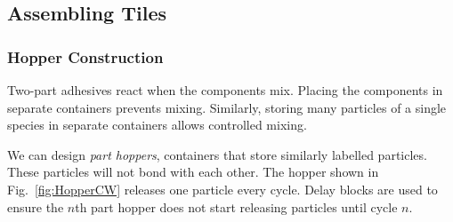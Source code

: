   
\subsection{Assembling Tiles}


\subsubsection{Hopper Construction}\label{subsec:HopperConstruction}
Two-part adhesives react when the components mix.  Placing the components in separate containers prevents mixing.  Similarly, storing many particles of a single species in separate containers allows controlled mixing.

We can design \emph{part hoppers}, containers that store similarly labelled particles.  These particles will not bond with each other.  The hopper shown in Fig.~\ref{fig:HopperCW} releases one particle every cycle. Delay blocks are used to ensure the $n$th part hopper does not start releasing particles until cycle $n$.

